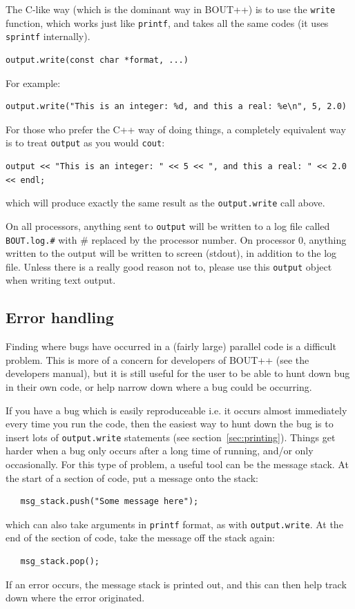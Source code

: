 \documentclass[12pt]{article}
\newcommand{\code}[1]{\texttt{#1}}
\begin{document}
The C-like way (which is the dominant way in BOUT++) is to use the \code{write}
function, which works just like \code{printf}, and takes all the same codes (it
uses \code{sprintf} internally).
%
%
\begin{lstlisting}
output.write(const char *format, ...)
\end{lstlisting}
%
For example:
%
\begin{lstlisting}
output.write("This is an integer: %d, and this a real: %e\n", 5, 2.0)
\end{lstlisting}
%
For those who prefer the C++ way of doing things, a completely equivalent way
is to treat \code{output} as you would \code{cout}:
%
\begin{lstlisting}
output << "This is an integer: " << 5 << ", and this a real: " << 2.0 << endl;
\end{lstlisting}
%
which will produce exactly the same result as the \code{output.write} call
above.

On all processors, anything sent to \code{output} will be written to a log file
called \texttt{BOUT.log.\#} with \# replaced by the processor number. On
processor 0, anything written to the output will be written to screen (stdout),
in addition to the log file.  Unless there is a really good reason not to,
please use this \code{output} object when writing text output.






\subsection{Error handling}
%
Finding where bugs have occurred in a (fairly large) parallel code is a
difficult problem.  This is more of a concern for developers of BOUT++ (see the
developers manual), but it is still useful for the user to be able to hunt down
bug in their own code, or help narrow down where a bug could be occurring.

If you have a bug which is easily reproduceable i.e. it occurs almost
immediately every time you run the code, then the easiest way to hunt down the
bug is to insert lots of \code{output.write} statements (see
section~\ref{sec:printing}). Things get harder when a bug only occurs after a
long time of running, and/or only occasionally. For this type of problem, a
useful tool can be the message stack.  At the start of a section of code, put a
message onto the stack:
%
%
\begin{lstlisting}
   msg_stack.push("Some message here");
\end{lstlisting}
%
which can also take arguments in \code{printf} format, as with
\code{output.write}. At the end of the section of code, take the message off
the stack again:
%
\begin{lstlisting}
   msg_stack.pop();
\end{lstlisting}
%
If an error occurs, the message stack is printed out, and this can then help
track down where the error originated.
\end{document}
